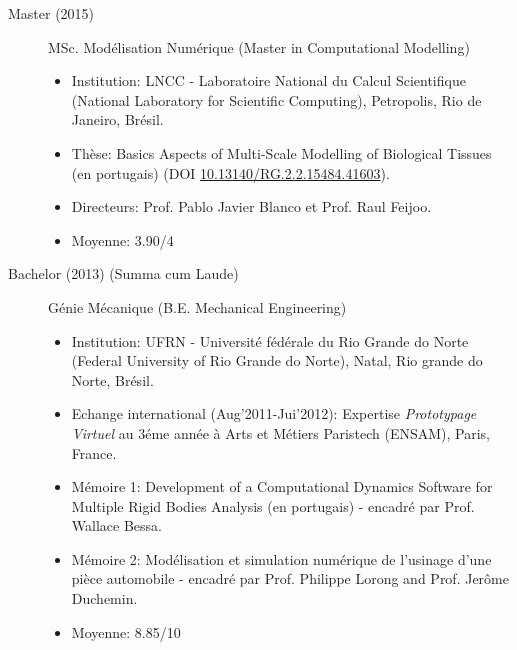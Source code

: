 \documentclass[french]{article}
\begin{document}
\begin{description}
\begin{itemize}
\end{itemize}
\item[Master (2015)] MSc. Modélisation Numérique (Master in Computational Modelling)
\begin{itemize}
\item Institution: LNCC - Laboratoire National du Calcul Scientifique (National Laboratory for Scientific Computing),  Petropolis, Rio de Janeiro, Brésil.
\item Thèse: Basics Aspects of Multi-Scale Modelling of Biological Tissues (en portugais) (DOI \url{10.13140/RG.2.2.15484.41603}).
\item Directeurs: Prof. Pablo Javier Blanco et Prof. Raul Feijoo.
\item Moyenne: 3.90/4 
\end{itemize}

\item[Bachelor (2013) (Summa cum Laude)] Génie Mécanique (B.E. Mechanical Engineering)
\begin{itemize}
	\item Institution: UFRN - Université fédérale du Rio Grande do Norte (Federal University of Rio Grande do Norte),  Natal, Rio grande do Norte, Brésil.
	\item Echange international (Aug'2011-Jui'2012): Expertise \textit{Prototypage Virtuel} au 3éme année à Arts et Métiers Paristech (ENSAM), Paris, France.
	\item Mémoire 1: Development of a Computational Dynamics Software for Multiple Rigid Bodies Analysis (en portugais) - encadré par Prof. Wallace Bessa.
	\item Mémoire 2: Modélisation et simulation numérique de l'usinage d'une pièce automobile - encadré par Prof. Philippe Lorong and Prof. Jerôme Duchemin.
	\item Moyenne: 8.85/10
\end{itemize}
\end{description}
\end{document}
